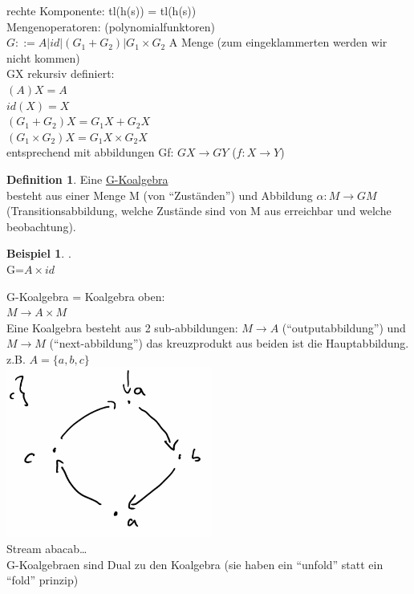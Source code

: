 \documentclass{article}
\theoremstyle{definition}
\newtheorem{beispiel}{Beispiel}[section]
\newtheorem{definition}{Definition}[section]
\begin{document}
	rechte Komponente: tl(h(s)) = tl(h(s))\\
	Mengenoperatoren: (polynomialfunktoren)\\
	$G::=A|id|(G_1+G_2)|G_1\times G_2$ A Menge (zum eingeklammerten werden wir nicht kommen)\\
	GX rekursiv definiert:\\
	$(A)X=A$\\
	$id(X)=X$\\
	$(G_1+G_2)X = G_1X+G_2X$\\
	$(G_1\times G_2)X = G_1X\times G_2X$\\
	entsprechend mit abbildungen Gf: $GX\to GY$ ($f:X\to Y$)\\
	\begin{definition} Eine \underline{G-Koalgebra}\\
	besteht aus einer Menge M (von ``Zuständen'') und Abbildung $\alpha:M\to GM$ (Transitionsabbildung, welche Zustände sind von M aus erreichbar und welche beobachtung).\\
	\end{definition}
	\begin{beispiel}.\\
	G=$A\times id$
	\end{beispiel}\noindent
	G-Koalgebra = Koalgebra oben:\\
	$M\to A\times M$\\
	Eine Koalgebra besteht aus 2 sub-abbildungen: $M\to A$ (``outputabbildung'') und $M\to M$ (``next-abbildung'') das kreuzprodukt aus beiden ist die Hauptabbildung.\\
	z.B. $A=\{a,b,c\}$\\
	\includegraphics[width=256px]{images/GKoalgebra-AS-Statemachine.png}\\
	Stream abacab\dots\\
	G-Koalgebraen sind Dual zu den Koalgebra (sie haben ein ``unfold'' statt ein ``fold'' prinzip)\\
\end{document}
